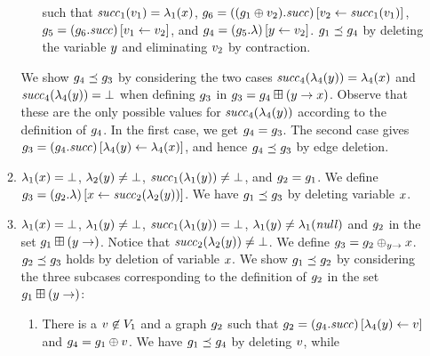 \begin{enumerate}
\begin{enumerate}
\begin{enumerate}
such that 
${\it succ}_1(v_1)=\lambda_1(x)$,
$g_6=\left((g_1\oplus{\ensuremath{v}_2}).{\it succ}\right)
\left[v_2\leftarrow{\it succ}_1(v_1)\right]$,
$g_5=\left(g_6.{\it succ}\right)\left[v_1\leftarrow v_2\right]$, and 
$g_4=\left(g_5.\lambda\right)\left[y\leftarrow v_2\right]$.
%
$g_1\preceq g_4$ by deleting the variable $y$ and 
eliminating $v_2$ by contraction.
\end{enumerate}
%
We show $g_4\preceq g_3$ by considering the two cases 
${\it succ}_4(\lambda_4(y))=\lambda_4(x)$
and 
${\it succ}_4(\lambda_4(y))=\bot$
when defining $g_3$ in 
$g_3=g_4\boxplus({y}\rightarrow{\ensuremath{x}})$.
%
Observe that these are the only possible values for 
${\it succ}_4(\lambda_4(y))$
according to the definition of $g_4$.
%
In the first case, we get $g_4=g_3$. %
%
The second case gives
$g_3=\left(g_4.{\it succ}\right)
\left[\lambda_4(y)\leftarrow\lambda_4(x)\right]$,
and hence $g_4\preceq g_3$ by edge deletion.
%
\item
$\lambda_1(x)=\bot$,
$\lambda_2(y)\neq\bot$,
${\it succ}_1(\lambda_1(y))\neq\bot$, and
$g_2=g_1$.
%
We define 
$g_3=\left(g_2.\lambda\right)
\left[x\leftarrow{\it succ}_2(\lambda_2(y))\right]$.
% 
% 
We have $g_1\preceq g_3$ by deleting variable $x$.
%
\item
$\lambda_1(x)=\bot$,
$\lambda_1(y)\neq\bot$,
${\it succ}_1(\lambda_1(y))=\bot$, 
$\lambda_1(y)\neq\lambda_1({\it null})$ and
$g_2$ in the set $g_1\boxplus({y}\rightarrow)$.
%
Notice that ${\it succ}_2(\lambda_2(y))\neq\bot$.
%
We define $g_3=g_2\oplus_{{y}\rightarrow}{x}$. 
%
$g_2\preceq g_3$ holds by deletion of variable 
$x$.
% 
We show $g_1\preceq g_2$ by considering the
three subcases corresponding to the definition of 
$g_2$ in the set $g_1\boxplus({y}\rightarrow)$:
\begin{enumerate}
\item 
\label{assignmentnext:undefined:defined:undefined:isolate}
There is a $v\not\in V_1$ and a graph $g_2$ 
such that $g_2=\left(g_4.{\it succ}\right)
\left[\lambda_4(y)\leftarrow v\right]$ and 
$g_4=g_1\oplus{\ensuremath{v}}$.
%
We have $g_1\preceq g_4$ by deleting $v$, while

\end{enumerate}
\end{enumerate}
\end{enumerate}
